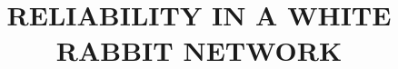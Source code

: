 \documentclass[reprint, superscriptaddress,aps,prstab]{revtex4-1}
\begin{document}
\title{RELIABILITY IN A WHITE RABBIT NETWORK}





\maketitle
























\end{document}
